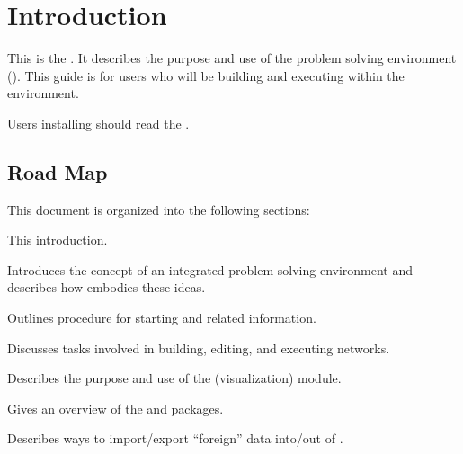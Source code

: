 %
%
%
%
%

%

\section{Introduction}
\label{sec:intro}


This is the \etitle{\srug}.  It describes the purpose and use of the
\sr{} problem solving environment (\pse).  This guide is for users who
will be building and executing  within the \sr{}
environment.

Users installing \sr{} should read the
.




\subsection{Road Map}
\label{sec:roadmap}

This document is organized into the following sections:

\begin{description}
   This introduction.
  
   Introduces the concept of
  an integrated problem solving environment and describes how \SR{}
  embodies these ideas.
  
   Outlines procedure
  for starting \sr{} and related information.

  Discusses tasks involved in building, editing, and executing
  networks.

  Describes the purpose and use of the \viewer{} (visualization) module.

   Gives an overview
  of the \sr{} and \biopse{} packages.
  
  Describes ways to import/export ``foreign'' data into/out of \SR{}.
\end{description}

